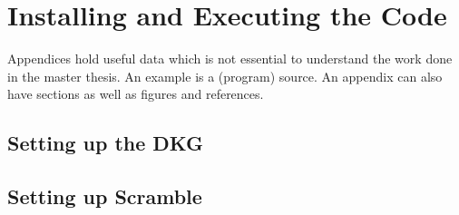 \chapter{Installing and Executing the Code}
\label{app:A}
Appendices hold useful data which is not essential to understand the work done in the master thesis. An example is a (program) source. An appendix can also have sections as well as figures and references\cite{h2g2}.

\section{Setting up the DKG}

\section{Setting up Scramble}


